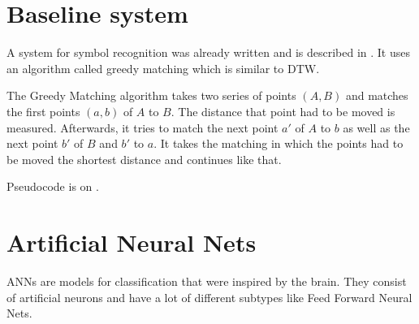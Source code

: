 
\chapter{Baseline system} %
\label{ch:Content1}


A system for symbol recognition was already written and is described in \cite{Kirsch}.
It uses an algorithm called greedy matching which is similar to \Gls{DTW}.

The Greedy Matching algorithm takes two series of points $(A, B)$ and matches
the first points $(a,b)$ of $A$ to $B$. The distance that point had to be moved is
measured. Afterwards, it tries to match the next point $a'$ of $A$ to $b$ as
well as the next point $b'$ of $B$ and $b'$ to $a$. It takes the matching in
which the points had to be moved the shortest distance and continues like that.

Pseudocode is on .



\chapter{Artificial Neural Nets}\label{ch:ANNs}

\Glspl{ANN} are models for classification that were inspired by the brain.
They consist of artificial neurons and have a lot of different subtypes like
Feed Forward Neural Nets.




